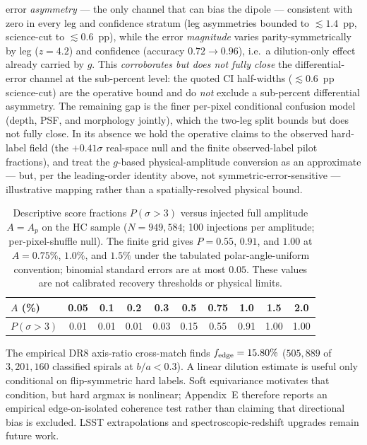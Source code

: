\documentclass[aps,prd,twocolumn,superscriptaddress,preprintnumbers,nofootinbib,longbibliography,floatfix]{revtex4-2}
\newcommand{\sigmaunit}{\sigma}
\begin{document}
error \emph{asymmetry} --- the only channel that can bias the dipole ---
consistent with zero in every leg and confidence stratum (leg asymmetries
bounded to $\lesssim\!1.4$~pp, science-cut to $\lesssim\!0.6$~pp), while
the error \emph{magnitude} varies parity-symmetrically by leg ($z\!=\!4.2$)
and confidence (accuracy $0.72\!\to\!0.96$), i.e.\ a dilution-only effect
already carried by $g$. This \emph{corroborates but does not fully close}
the differential-error channel at the sub-percent level: the quoted CI
half-widths ($\lesssim\!0.6$~pp science-cut) are the operative bound and
do \emph{not} exclude a sub-percent differential asymmetry. The remaining
gap is the finer per-pixel
conditional confusion model (depth, PSF, and morphology jointly), which
the two-leg split bounds but does not fully close. In its
absence we hold the operative claims to the observed hard-label field
(the $+0.41\sigmaunit$ real-space null and the finite observed-label pilot
fractions), and treat the $g$-based physical-amplitude conversion as an
approximate --- but, per the leading-order identity above, not
symmetric-error-sensitive --- illustrative mapping rather than a
spatially-resolved physical bound.

\begin{table}[H]
\caption{Descriptive score fractions $P(\sigma>3)$ versus injected full amplitude $A=A_p$ on the HC sample ($N=949{,}584$; 100 injections per amplitude; per-pixel-shuffle null). The finite grid gives $P=0.55$, $0.91$, and $1.00$ at $A=0.75\%$, $1.0\%$, and $1.5\%$ under the tabulated polar-angle-uniform convention; binomial standard errors are at most $0.05$. These values are not calibrated recovery thresholds or physical limits.\label{tab:injection_recovery}}
\begin{ruledtabular}
\begin{tabular}{lccccccccc}
$A$ (\%) & 0.05 & 0.1 & 0.2 & 0.3 & 0.5 & 0.75 & 1.0 & 1.5 & 2.0 \\
\hline
$P(\sigma\!>\!3)$ & 0.01 & 0.01 & 0.01 & 0.03 & 0.15 & 0.55 & 0.91 & 1.00 & 1.00 \\
\end{tabular}
\end{ruledtabular}
\end{table}

The empirical DR8 axis-ratio cross-match finds $f_{\rm edge}=15.80\%$ ($505{,}889$ of $3{,}201{,}160$ classified spirals at $b/a<0.3$). A linear dilution estimate is useful only conditional on flip-symmetric hard labels. Soft equivariance motivates that condition, but hard argmax is nonlinear; Appendix~E therefore reports an empirical edge-on-isolated coherence test rather than claiming that directional bias is excluded. LSST extrapolations and spectroscopic-redshift upgrades remain future work.
\end{document}
